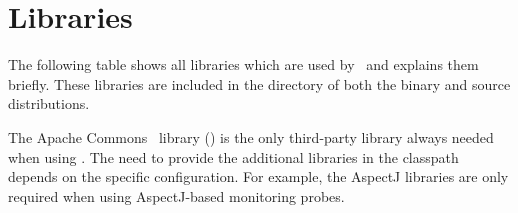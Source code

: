 \chapter{Libraries}\label{appendix:libraries}
    The following table shows all libraries which are used by \Kieker\ and explains them briefly. %
These libraries are included in the  directory of both the \Kieker{} binary and %
source distributions.

The Apache Commons~\cite{CommonsLogging-WebSite} library (\file{\commonsLoggingJar}) %
is the only third-party library always needed when using \Kieker{}. %
The need to provide the additional libraries in the classpath depends on the %
specific configuration. For example, the AspectJ libraries are only required %
when using AspectJ-based monitoring probes.

    


